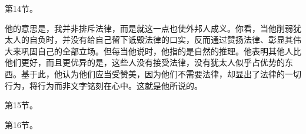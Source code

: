第14节。\par

他的意思是，我并非排斥法律，而是就这一点也使外邦人成义。你看，当他削弱犹太人的自负时，并没有给自己留下诋毁法律的口实，反而通过赞扬法律、彰显其伟大来巩固自己的全部立场。但每当他说时，他指的是自然的推理。他表明其他人比他们更好，而且更优异的是，这些人没有接受法律，没有犹太人似乎占优势的东西。基于此，他认为他们应当受赞美，因为他们不需要法律，却显出了法律的一切行为，将行为而非文字铭刻在心中。这就是他所说的。\par

第15节。\par

第16节。\par

